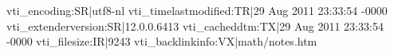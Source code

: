 vti_encoding:SR|utf8-nl
vti_timelastmodified:TR|29 Aug 2011 23:33:54 -0000
vti_extenderversion:SR|12.0.0.6413
vti_cacheddtm:TX|29 Aug 2011 23:33:54 -0000
vti_filesize:IR|9243
vti_backlinkinfo:VX|math/notes.htm
